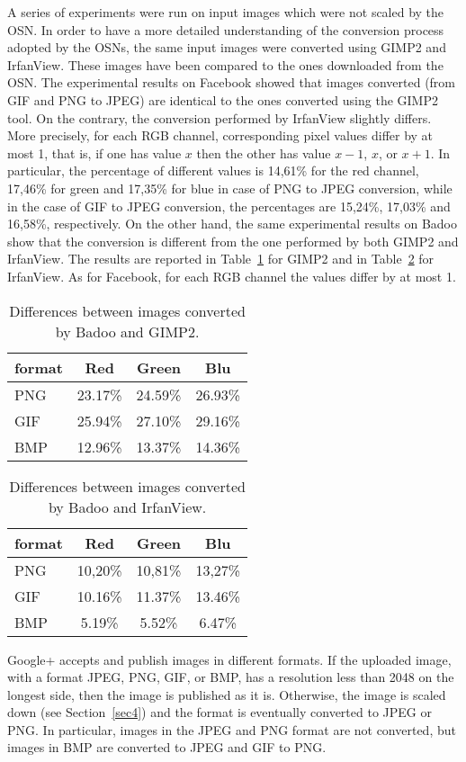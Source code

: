 \documentclass[10pt, conference]{IEEEtran}
\begin{document}
A series of experiments were run on input images which were not scaled by the OSN. In order to have a more detailed understanding of the conversion process adopted by the OSNs, the same input images were converted using GIMP2 and IrfanView. These images have been compared to the ones downloaded from the OSN. The experimental results on Facebook showed that images converted (from GIF and PNG to JPEG) are identical to the ones converted using the GIMP2 tool.
On the contrary, the conversion performed by IrfanView slightly differs. More precisely, for each RGB channel, corresponding pixel values differ by at most 1, that is, if one has value $x$ then the other has value $x-1$, $x$, or $x+1$. In particular, the percentage of different values is 14,61\% for the red channel, 17,46\% for green and 17,35\% for blue in case of PNG to JPEG conversion, while in the case of GIF to JPEG conversion, the percentages are 15,24\%, 17,03\% and 16,58\%, respectively.
On the other hand, the same experimental results on Badoo show that the conversion is different from the one performed by both GIMP2 and IrfanView. The results are reported in Table~\ref{tab:GIMP2} for GIMP2 and in Table~\ref{tab:IrfanView} for IrfanView. As for Facebook, for each RGB channel the values differ by at most 1. 
\begin{table}[htbp]
\caption{Differences between images converted by Badoo and GIMP2.}
\centering
\begin{tabular}{| l | c | c | c |}
\hline
 format & Red & Green & Blu\\
\hline\hline
PNG & 23.17\% & 24.59\% & 26.93\%\\
GIF & 25.94\% & 27.10\% & 29.16\%\\
BMP & 12.96\% & 13.37\% & 14.36\%\\
\hline
\end{tabular}
\label{tab:GIMP2}
\end{table}

\begin{table}[htbp]
\caption{Differences between images converted by Badoo and  IrfanView.}
\centering
\begin{tabular}{| l | c | c | c |}
\hline
 format & Red & Green & Blu\\
\hline\hline
PNG & 10,20\% & 10,81\% & 13,27\%\\
GIF & 10.16\% & 11.37\% & 13.46\%\\
BMP & 5.19\% & 5.52\% & 6.47\%\\
\hline
\end{tabular}
\label{tab:IrfanView}
\end{table}
Google+ accepts and publish images in different formats. If the uploaded image, with a format JPEG, PNG, GIF, or BMP, has a resolution less than 2048 on the longest side, then the image is published as it is. Otherwise, the image is scaled down (see Section~\ref{sec4}) and the format is eventually converted to JPEG or PNG. In particular, images in the JPEG and PNG format are not converted, but images in BMP are converted to JPEG and GIF to PNG.
\end{document}
